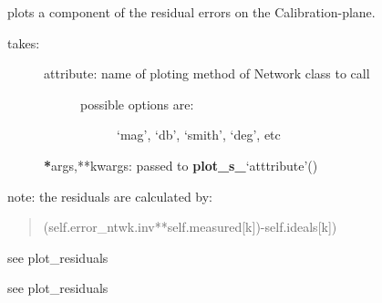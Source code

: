 \documentclass[letterpaper,10pt,english]{sphinxmanual}
\begin{document}
\begin{fulllineitems}
\begin{fulllineitems}
\end{fulllineitems}


\begin{fulllineitems}
\label{api/mwavepy.calibration:mwavepy.calibration.calibration.Calibration.plot_residuals}
plots a component of the residual errors on the  Calibration-plane.
\begin{description}
\item[{takes:}] \leavevmode\begin{description}
\item[{attribute: name of ploting method of Network class to call}] \leavevmode\begin{description}
\item[{possible options are:}] \leavevmode
`mag', `db', `smith', `deg', etc

\end{description}

\end{description}

{\color{red}\bfseries{}*}args,**kwargs: passed to {\color{red}\bfseries{}plot\_s\_}`atttribute'()

\end{description}

note:
the residuals are calculated by:
\begin{quote}

(self.error\_ntwk.inv**self.measured{[}k{]})-self.ideals{[}k{]})
\end{quote}

\end{fulllineitems}


\begin{fulllineitems}
\label{api/mwavepy.calibration:mwavepy.calibration.calibration.Calibration.plot_residuals_db}
see plot\_residuals

\end{fulllineitems}


\begin{fulllineitems}
\label{api/mwavepy.calibration:mwavepy.calibration.calibration.Calibration.plot_residuals_mag}
see plot\_residuals


\end{fulllineitems}
\end{fulllineitems}
\end{document}
